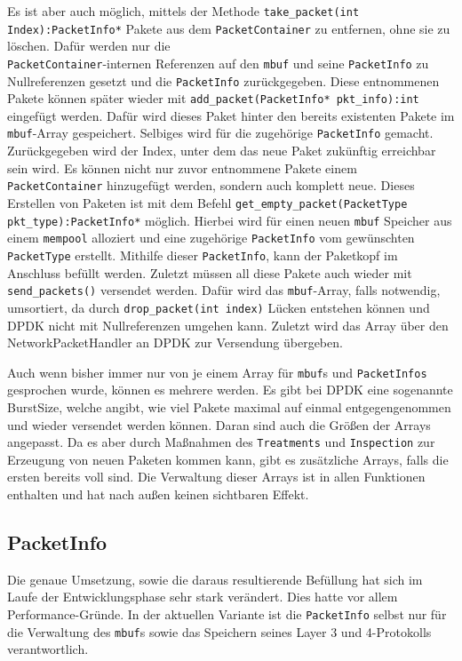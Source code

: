 \documentclass[../review_3.tex]{subfiles}
\begin{document}
Es ist aber auch möglich, mittels der Methode \texttt{take\_packet(int Index):PacketInfo*} Pakete aus dem \texttt{PacketContainer} zu entfernen, ohne sie zu löschen. Dafür werden nur die\\ \texttt{PacketContainer}-internen Referenzen auf den \texttt{mbuf} und seine \texttt{PacketInfo} zu Nullreferenzen gesetzt und die \texttt{PacketInfo} zurückgegeben. Diese entnommenen Pakete können später wieder mit \texttt{add\_packet(PacketInfo* pkt\_info):int} eingefügt werden. Dafür wird dieses Paket hinter den bereits existenten Pakete im \texttt{mbuf}-Array gespeichert. Selbiges wird für die zugehörige \texttt{PacketInfo} gemacht. Zurückgegeben wird der Index, unter dem das neue Paket zukünftig erreichbar sein wird. Es können nicht nur zuvor entnommene Pakete einem \texttt{PacketContainer} hinzugefügt werden, sondern auch komplett neue. Dieses Erstellen von Paketen ist mit dem Befehl \texttt{get\_empty\_packet(PacketType pkt\_type):PacketInfo*} möglich. Hierbei wird für einen neuen \texttt{mbuf} Speicher aus einem \texttt{mempool} alloziert und eine zugehörige \texttt{PacketInfo} vom gewünschten \texttt{PacketType} erstellt. Mithilfe dieser \texttt{PacketInfo}, kann der Paketkopf im Anschluss befüllt werden. Zuletzt müssen all diese Pakete auch wieder mit \texttt{send\_packets()} versendet werden. Dafür wird das \texttt{mbuf}-Array, falls notwendig, umsortiert, da durch \texttt{drop\_packet(int index)} Lücken entstehen können und DPDK nicht mit Nullreferenzen umgehen kann. Zuletzt wird das Array über den NetworkPacketHandler an DPDK zur Versendung übergeben.

Auch wenn bisher immer nur von je einem Array für \texttt{mbuf}s und \texttt{PacketInfos} gesprochen wurde, können es mehrere werden. Es gibt bei DPDK eine sogenannte BurstSize, welche angibt, wie viel Pakete maximal auf einmal entgegengenommen und wieder versendet werden können. Daran sind auch die Größen der Arrays angepasst. Da es aber durch Maßnahmen des \texttt{Treatments} und \texttt{Inspection} zur Erzeugung von neuen Paketen kommen kann, gibt es zusätzliche Arrays, falls die ersten bereits voll sind. Die Verwaltung dieser Arrays ist in allen Funktionen enthalten und hat nach außen keinen sichtbaren Effekt.

\subsection{PacketInfo}
Die genaue Umsetzung, sowie die daraus resultierende Befüllung hat sich im Laufe der Entwicklungsphase sehr stark verändert. Dies hatte vor allem Performance-Gründe. In der aktuellen Variante ist die \texttt{PacketInfo} selbst nur für die Verwaltung des \texttt{mbuf}s sowie das Speichern seines Layer 3 und 4-Protokolls verantwortlich.
\end{document}
